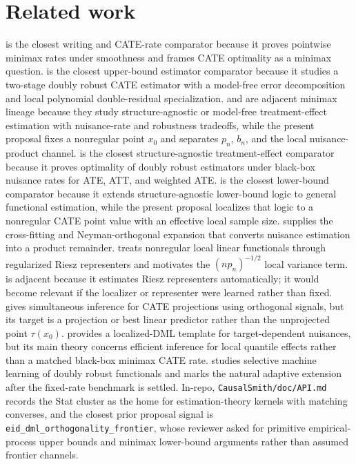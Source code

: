 \documentclass[11pt]{article}
\theoremstyle{definition}
\theoremstyle{plain}
\theoremstyle{remark}
\begin{document}
\section{Related work}
\citet{KennedyBalakrishnanRobinsWasserman2024MinimaxCATE} is the closest writing and CATE-rate comparator because it proves pointwise minimax rates under smoothness and frames CATE optimality as a minimax question.
\citet{Kennedy2023DRCATE} is the closest upper-bound estimator comparator because it studies a two-stage doubly robust CATE estimator with a model-free error decomposition and local polynomial double-residual specialization.
\citet{BonviniKennedyDukesBalakrishnan2024StructureAgnostic} and \citet{BalakrishnanKennedyWasserman2023StructureAgnostic} are adjacent minimax lineage because they study structure-agnostic or model-free treatment-effect estimation with nuisance-rate and robustness tradeoffs, while the present proposal fixes a nonregular point $x_0$ and separates $p_n$, $b_n$, and the local nuisance-product channel.
\citet{JinSyrgkanis2024StructureAgnosticDR} is the closest structure-agnostic treatment-effect comparator because it proves optimality of doubly robust estimators under black-box nuisance rates for ATE, ATT, and weighted ATE.
\citet{JinSyrgkanis2025GeneralLinearFunctionalLowerBounds} is the closest lower-bound comparator because it extends structure-agnostic lower-bound logic to general functional estimation, while the present proposal localizes that logic to a nonregular CATE point value with an effective local sample size.
\citet{ChernozhukovEtAl2018DML} supplies the cross-fitting and Neyman-orthogonal expansion that converts nuisance estimation into a product remainder.
\citet{ChernozhukovNeweySingh2022LocalRiesz} treats nonregular local linear functionals through regularized Riesz representers and motivates the $(n p_n)^{-1/2}$ local variance term.
\citet{ChernozhukovNeweyQuintasMartinezSyrgkanis2021RieszRegression} is adjacent because it estimates Riesz representers automatically; it would become relevant if the localizer or representer were learned rather than fixed.
\citet{SemenovaChernozhukov2021DMLCATE} gives simultaneous inference for CATE projections using orthogonal signals, but its target is a projection or best linear predictor rather than the unprojected point $\tau(x_0)$.
\citet{KallusMaoUehara2024LDML} provides a localized-DML template for target-dependent nuisances, but its main theory concerns efficient inference for local quantile effects rather than a matched black-box minimax CATE rate.
\citet{CuiTchetgenTchetgen2024SelectiveDR} studies selective machine learning of doubly robust functionals and marks the natural adaptive extension after the fixed-rate benchmark is settled.
In-repo, \texttt{CausalSmith/doc/API.md} records the Stat cluster as the home for estimation-theory kernels with matching converses, and the closest prior proposal signal is \texttt{eid\_dml\_orthogonality\_frontier}, whose reviewer asked for primitive empirical-process upper bounds and minimax lower-bound arguments rather than assumed frontier channels.
\end{document}
